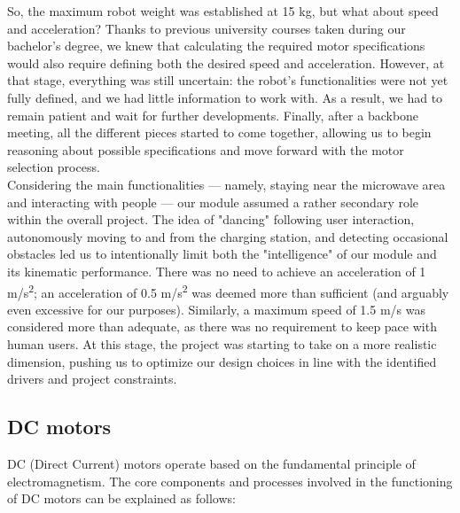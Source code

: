 \documentclass{article}
\begin{document}
So, the maximum robot weight was established at 15 kg, but what about speed and acceleration? Thanks to previous university courses taken during our bachelor's degree, we knew that calculating the required motor specifications would also require defining both the desired speed and acceleration. However, at that stage, everything was still uncertain: the robot's functionalities were not yet fully defined, and we had little information to work with. As a result, we had to remain patient and wait for further developments. Finally, after a backbone meeting, all the different pieces started to come together, allowing us to begin reasoning about possible specifications and move forward with the motor selection process. \\

Considering the main functionalities — namely, staying near the microwave area and interacting with people — our module assumed a rather secondary role within the overall project. The idea of "dancing" following user interaction, autonomously moving to and from the charging station, and detecting occasional obstacles led us to intentionally limit both the "intelligence" of our module and its kinematic performance. There was no need to achieve an acceleration of 1 m/s\textsuperscript{2}; an acceleration of 0.5 m/s\textsuperscript{2} was deemed more than sufficient (and arguably even excessive for our purposes). Similarly, a maximum speed of 1.5 m/s was considered more than adequate, as there was no requirement to keep pace with human users. At this stage, the project was starting to take on a more realistic dimension, pushing us to optimize our design choices in line with the identified drivers and project constraints.

\subsection{DC motors}

DC (Direct Current) motors operate based on the fundamental principle of electromagnetism. The core components and processes involved in the functioning of DC motors can be explained as follows:
\end{document}
